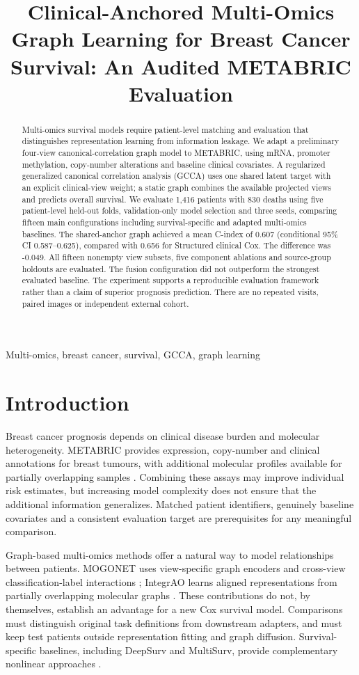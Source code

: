 \documentclass{article}
\title{Clinical-Anchored Multi-Omics Graph Learning for Breast Cancer Survival: An Audited METABRIC Evaluation}
\begin{document}
\maketitle
\begin{abstract}
Multi-omics survival models require patient-level matching and evaluation that
distinguishes representation learning from information leakage. We adapt a
preliminary four-view canonical-correlation graph model to METABRIC, using
mRNA, promoter methylation, copy-number alterations and baseline clinical
covariates. A regularized generalized canonical correlation analysis (GCCA)
uses one shared latent target with an explicit clinical-view weight; a static
graph combines the available projected views and predicts overall survival.
We evaluate 1,416 patients with 830 deaths using five patient-level held-out
folds, validation-only model selection and three seeds, comparing fifteen
main configurations including survival-specific and adapted multi-omics
baselines. The shared-anchor graph achieved a mean C-index of 0.607 (conditional 95\% CI 0.587--0.625), compared with 0.656 for Structured clinical Cox. The difference was -0.049. All fifteen nonempty view subsets, five
component ablations and source-group holdouts are evaluated. The fusion configuration did not outperform the strongest evaluated baseline. The experiment supports a reproducible evaluation framework rather than a claim of superior prognosis prediction.
There are no repeated visits, paired images or independent external cohort.
\end{abstract}
\begin{keywords}Multi-omics, breast cancer, survival, GCCA, graph learning\end{keywords}
\section{Introduction}
Breast cancer prognosis depends on clinical disease burden and molecular
heterogeneity. METABRIC provides expression, copy-number and clinical
annotations for breast tumours, with additional molecular profiles available
for partially overlapping samples \cite{curtis,pereira}. Combining these
assays may improve individual risk estimates, but increasing model complexity
does not ensure that the additional information generalizes. Matched patient
identifiers, genuinely baseline covariates and a consistent evaluation target
are prerequisites for any meaningful comparison.

Graph-based multi-omics methods offer a natural way to model relationships
between patients. MOGONET uses view-specific graph encoders and cross-view
classification-label interactions \cite{mogonet}; IntegrAO learns aligned
representations from partially overlapping molecular graphs \cite{integrao}.
These contributions do not, by themselves, establish an advantage for a new
Cox survival model. Comparisons must distinguish original task definitions
from downstream adapters, and must keep test patients outside representation
fitting and graph diffusion. Survival-specific baselines, including DeepSurv
and MultiSurv, provide complementary nonlinear approaches \cite{deepsurv,multisurv}.
\end{document}
